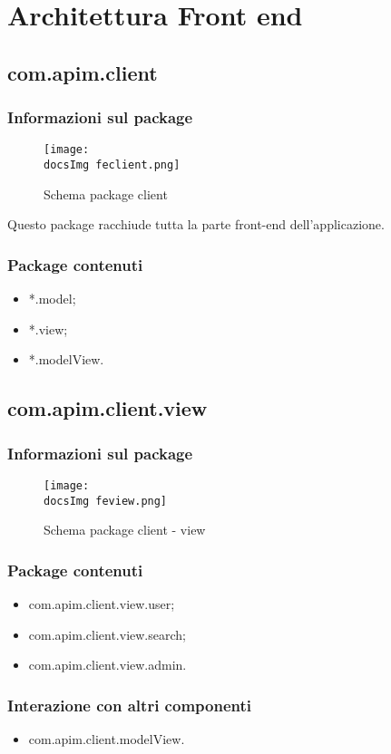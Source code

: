 \section{Architettura Front end}{
	\subsection{com.apim.client}{
		\subsubsection{Informazioni sul package}{
			\begin{figure}[H]
				\centering
				\texttt{[image: \\docsImg feclient.png]}
				\caption{Schema package client}
			\end{figure}
		Questo package racchiude tutta la parte front-end dell'applicazione.
		}
		\subsubsection {Package contenuti}{
			\begin{itemize}
				\item *.model;
				\item *.view;
				\item *.modelView.
			\end{itemize}
		}
	}
	\subsection{com.apim.client.view}{
		\subsubsection{Informazioni sul package}{
			\begin{figure}[H]
				\centering
				\texttt{[image: \\docsImg feview.png]}
				\caption{Schema package client - view}
			\end{figure}
		}
		\subsubsection{Package contenuti}{
			\begin{itemize}
				\item com.apim.client.view.user;
				\item com.apim.client.view.search;
				\item com.apim.client.view.admin.
			\end{itemize}
		}
		\subsubsection{Interazione con altri componenti}{
			\begin{itemize}
				\item com.apim.client.modelView.
			\end{itemize}
		}
}}
